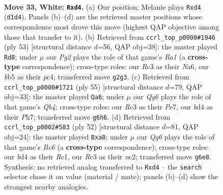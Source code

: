 \documentclass[11pt]{article}
\begin{document}
\clearpage

\begin{figure}[p]\centering
\begin{subfigure}{0.46\textwidth}\centering
\resizebox{\linewidth}{!}{%
\newchessgame
\chessboard[
  setfen={4r3/kp2p2n/1r1p2Q1/1b4p1/3bP3/1PR2P2/6PP/1K1R4 w - - 0 33},
  showmover=false,
  pgfstyle=straightmove, color=movearrow, markmove={d1-d4}
]}
\caption{}
\end{subfigure}\hfill
\begin{subfigure}{0.46\textwidth}\centering
\resizebox{\linewidth}{!}{%
\newchessgame
\chessboard[
  setfen={r7/pp2kp1Q/n1p3r1/8/2P2q2/8/PP2BP1P/1K1R3R b - - 2 27},
  showmover=false,
  pgfstyle=straightmove, color=movearrow, markmove={a8-d8}
]}
\caption{}
\end{subfigure}
\\[4pt]
\begin{subfigure}{0.46\textwidth}\centering
\resizebox{\linewidth}{!}{%
\newchessgame
\chessboard[
  setfen={2r3k1/p3p2p/4P1p1/1qpr2N1/7P/1Pp1B3/P1P3P1/1K3R1R b - - 4 28},
  showmover=false,
  pgfstyle=straightmove, color=movearrow, markmove={b5-a6}
]}
\caption{}
\end{subfigure}\hfill
\begin{subfigure}{0.46\textwidth}\centering
\resizebox{\linewidth}{!}{%
\newchessgame
\chessboard[
  setfen={rr4k1/5ppp/p1B1p3/R3P3/7P/1b2P1P1/1Pn2P2/2R3K1 w - - 1 27},
  showmover=false,
  pgfstyle=straightmove, color=movearrow, markmove={c6-a8}
]}
\caption{}
\end{subfigure}
\caption{\textbf{Move 33, White: \texttt{Rxd4}.} (a) Our position; Melanie plays \texttt{Rxd4} (\texttt{d1d4}). Panels (b)--(d) are the retrieved master positions whose correspondence most drove this move (highest QAP objective among those that transfer to it). (b) Retrieved from \texttt{ccrl\_top\_p0000\#1946} (ply 53) [structural distance $d$=56, QAP obj=38]: the master played \texttt{Rd8}; under $\mu$ our \emph{Pg2} plays the role of that game's \emph{Ra1} (a \textbf{cross-type} correspondence); cross-type roles: our \emph{R}c3 as their \emph{N}a6, our \emph{b}b5 as their \emph{p}c4; transferred move \texttt{g2g3}. (c) Retrieved from \texttt{ccrl\_top\_p0000\#1721} (ply 55) [structural distance $d$=79, QAP obj=33]: the master played \texttt{Qa6}; under $\mu$ our \emph{Qg6} plays the role of that game's \emph{Qb4}; cross-type roles: our \emph{R}c3 as their \emph{P}e7, our \emph{b}d4 as their \emph{P}h7; transferred move \texttt{g6h6}. (d) Retrieved from \texttt{ccrl\_top\_p0002\#583} (ply 52) [structural distance $d$=81, QAP obj=24]: the master played \texttt{Bxa8}; under $\mu$ our \emph{Qg6} plays the role of that game's \emph{Bc6} (a \textbf{cross-type} correspondence); cross-type roles: our \emph{b}d4 as their \emph{R}c1, our \emph{R}c3 as their \emph{n}c2; transferred move \texttt{g6e8}. Synthesis: no retrieved analog transferred to \texttt{Rxd4} -- the \texttt{search} selector chose it on value (material / mate); panels (b)--(d) show the strongest nearby analogies.}
\label{fig:thought-m64}
\end{figure}
\end{document}
